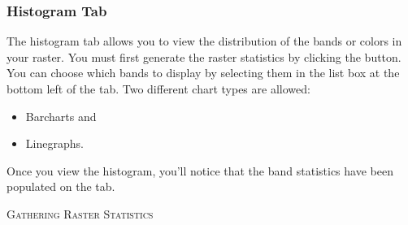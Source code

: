 \subsubsection{Histogram Tab}\label{label_histogram}

The histogram tab allows you to view the distribution 
of the bands or colors in your raster. You must first generate the raster statistics 
by clicking the  button. You can choose which bands to display by 
selecting them in the list box at the bottom left of the tab. Two different
chart types are allowed: 
\begin{itemize}
\item Barcharts and 
\item Linegraphs.
\end{itemize}

Once you view the histogram, you'll notice that the band statistics have been
populated on the  tab.

\begin{Tip}\caption{\textsc{Gathering Raster Statistics}}
\end{Tip}

